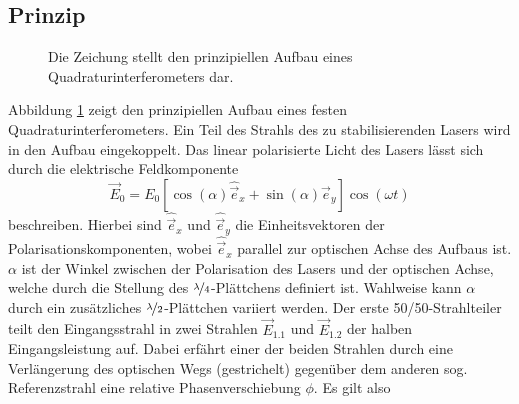\subsection{Prinzip}\label{subsec:quadraturinterferometer_prinzip}
\begin{figure}[h]
 	\centering
	\caption[Quadraturinterferometer - prinzipieller Aufbau]{Die
	Zeichung stellt den prinzipiellen Aufbau eines
	Quadraturinterferometers dar.}\label{fig:quadraturinterferometer_aufbau}
\end{figure}
Abbildung \ref{fig:quadraturinterferometer_aufbau} zeigt den prinzipiellen
Aufbau eines festen Quadraturinterferometers. Ein Teil des Strahls des zu stabilisierenden
Lasers wird in den Aufbau eingekoppelt. Das linear polarisierte
Licht des Lasers lässt sich durch die elektrische Feldkomponente
\begin{equation}\label{eq:quadraturinterfferometer_01}
	\vec{E}_0=E_0\left[\cos{(\alpha)}\hat{\vec{e}}_x+\sin{(\alpha)}\hat{\vec{e}}_y\right]\cos{(\omega
	t)}
\end{equation}
beschreiben. Hierbei sind $\hat{\vec{e}}_x$ und $\hat{\vec{e}}_y$ die
Einheitsvektoren der Polarisationskomponenten, wobei $\hat{\vec{e}}_x$ parallel
zur optischen Achse des Aufbaus ist. $\alpha$ ist der Winkel zwischen der
Polarisation des Lasers und der optischen Achse, welche durch die Stellung des
$\nicefrac{\lambda}{4}$-Plättchens definiert ist. Wahlweise kann $\alpha$ durch
ein zusätzliches $\nicefrac{\lambda}{2}$-Plättchen variiert werden.
Der erste 50/50-Strahlteiler teilt den Eingangsstrahl in zwei Strahlen
$\vec{E}_{1.1}$ und $\vec{E}_{1.2}$ der halben Eingangsleistung auf. Dabei erfährt einer der
beiden Strahlen durch eine Verlängerung des optischen Wegs (gestrichelt)
gegenüber dem anderen sog.
Referenzstrahl eine relative Phasenverschiebung $\phi$. Es gilt also
